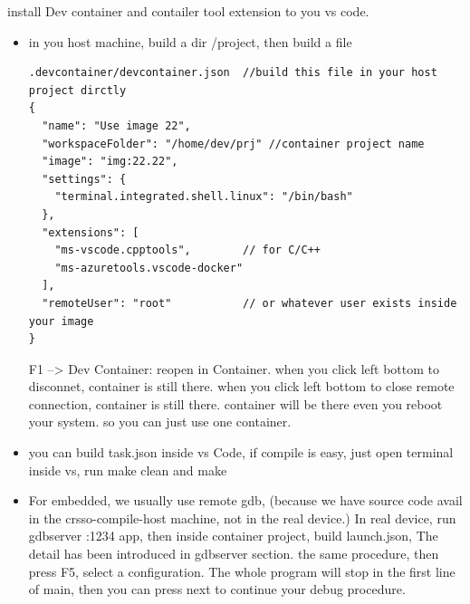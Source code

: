 \documentclass[paper=8.5in:11in, twoside, 12pt, pagesize=pdftex]{book}
\begin{document}
install Dev container and contailer tool extension to you vs code.
\begin{itemize}
\item in you host machine, build a dir /project, then build a file
\begin{lstlisting}
.devcontainer/devcontainer.json  //build this file in your host project dirctly
{
  "name": "Use image 22",
  "workspaceFolder": "/home/dev/prj" //container project name
  "image": "img:22.22",  
  "settings": {
    "terminal.integrated.shell.linux": "/bin/bash"
  },
  "extensions": [
    "ms-vscode.cpptools",        // for C/C++
    "ms-azuretools.vscode-docker"
  ],
  "remoteUser": "root"           // or whatever user exists inside your image
}
\end{lstlisting}
F1 --> Dev Container: reopen in Container.  when you click left bottom to disconnet, container is still there. when you click left bottom to close remote connection, container is still there. container will be there even you reboot your system. so you can just use one container. 

\item you can build task.json inside vs Code, if compile is easy, just open terminal inside vs, run make clean and make

\item For embedded, we usually use remote gdb, (because we have source code avail in the crsso-compile-host machine, not in the real device.) In real device, run gdbserver :1234 app, then inside container project, build launch.json,  The detail has been introduced in gdbserver section. the same procedure, then press F5, select a configuration. The whole program will stop in the first line of main, then you can press next to continue your debug procedure.   
\end{itemize}
\end{document}
